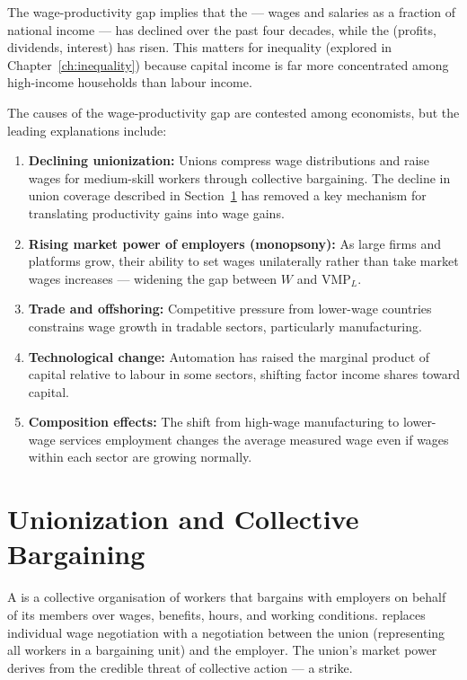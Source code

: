 The wage-productivity gap implies that the 
--- wages and salaries as a fraction of national income --- has declined
over the past four decades, while the  (profits,
dividends, interest) has risen. This matters for inequality (explored
in Chapter~\ref{ch:inequality}) because capital income is far more
concentrated among high-income households than labour income.

The causes of the wage-productivity gap are contested among economists,
but the leading explanations include:

\begin{enumerate}
  \item \textbf{Declining unionization:} Unions compress wage distributions
        and raise wages for medium-skill workers through collective bargaining.
        The decline in union coverage described in Section~\ref{sec:unions}
        has removed a key mechanism for translating productivity gains into
        wage gains.
  \item \textbf{Rising market power of employers (monopsony):} As large
        firms and platforms grow, their ability to set wages unilaterally
        rather than take market wages increases --- widening the gap between
        $W$ and $\text{VMP}_L$.
  \item \textbf{Trade and offshoring:} Competitive pressure from lower-wage
        countries constrains wage growth in tradable sectors, particularly
        manufacturing.
  \item \textbf{Technological change:} Automation has raised the marginal
        product of capital relative to labour in some sectors, shifting
        factor income shares toward capital.
  \item \textbf{Composition effects:} The shift from high-wage manufacturing
        to lower-wage services employment changes the average measured wage
        even if wages within each sector are growing normally.
\end{enumerate}

\section{Unionization and Collective Bargaining}
\label{sec:unions}

A  is a collective organisation of workers that bargains
with employers on behalf of its members over wages, benefits, hours, and
working conditions.  replaces individual
wage negotiation with a negotiation between the union (representing all
workers in a bargaining unit) and the employer. The union's market power
derives from the credible threat of collective action --- a strike.

